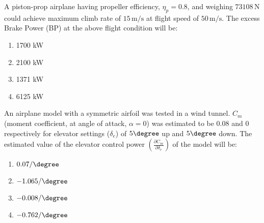 \item  A piston-prop airplane having propeller efficiency, $\eta_p = 0.8$, and weighing $73108 \, \text{N}$ could achieve maximum climb rate of $15 \, \text{m/s}$ at flight speed of $50 \, \text{m/s}$. The excess Brake Power (BP) at the above flight condition will be:
\begin{multicols}{4}
\begin{enumerate}
\item 1700 kW
\item 2100 kW
\item 1371 kW
\item 6125 kW
\end{enumerate}
\end{multicols}
\item  An airplane model with a symmetric airfoil was tested in a wind tunnel. $C_{m}$ (moment coefficient, at angle of attack, $\alpha = 0$) was estimated to be 0.08 and 0 respectively for elevator settings ($\delta_e$) of $5 \degree$ up and $5 \degree$ down. The estimated value of the elevator control power $\left( \frac{\partial C_m}{\partial \delta_e} \right)$ of the model will be:
\begin{multicols}{4}
\begin{enumerate}
\item $0.07 / \degree$
\item $-1.065 / \degree$
\item $-0.008 / \degree$
\item $-0.762 / \degree$
\end{enumerate}
\end{multicols}




